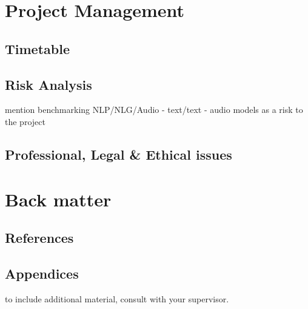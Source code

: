 \documentclass[11pt]{article}
\begin{document}
\pagebreak
\section{Project Management}
\subsection{Timetable}

\subsection{Risk Analysis}

mention benchmarking NLP/NLG/Audio - text/text - audio models as a risk to the project

\subsection{Professional, Legal \& Ethical issues}

\pagebreak
\appendix
\section{Back matter}
\subsection{References}
\printbibliography

\subsection{Appendices}
to include additional material, consult with your supervisor.\\

\printnoidxglossary[type=acronym]
\printacronyms
\end{document}
